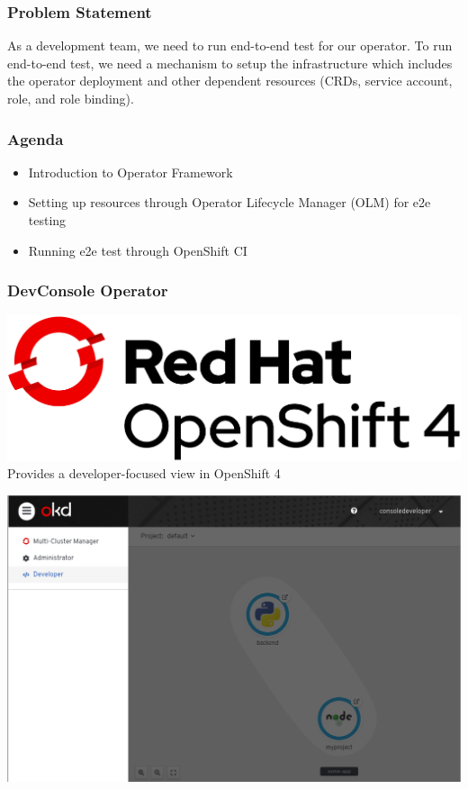 \documentclass[aspectratio=169]{beamer}
\begin{document}
\begin{frame}
  \frametitle{Problem Statement}

  As a development team, we need to run end-to-end test for our
  operator.  To run end-to-end test, we need a mechanism to setup the
  infrastructure which includes the operator deployment and other
  dependent resources (CRDs, service account, role, and role binding).

\end{frame}

\begin{frame}
  \frametitle{Agenda}

  \begin{itemize}
  \item Introduction to Operator Framework
  \item Setting up resources through Operator Lifecycle Manager (OLM)
    for e2e testing
  \item Running e2e test through OpenShift CI
  \end{itemize}

\end{frame}

\begin{frame}
  \frametitle{DevConsole Operator}

  \includegraphics[scale=.15]{images/Logo-Red_Hat-OpenShift_4-A-Standard-RGB.png}\\[.25in]

  Provides a developer-focused view in OpenShift 4

\end{frame}

\begin{frame}

  \includegraphics[scale=.25]{images/devconsole.png}

\end{frame}
\end{document}
